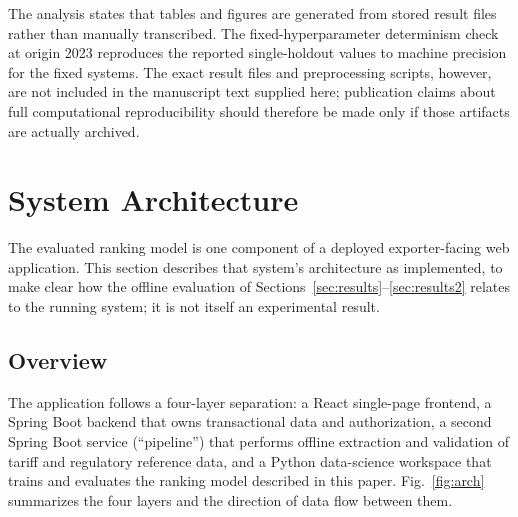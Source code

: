 \documentclass[conference]{IEEEtran}
\begin{document}
The analysis states that tables and figures are generated from stored result files rather than manually transcribed. The fixed-hyperparameter determinism check at origin 2023 reproduces the reported single-holdout values to machine precision for the fixed systems. The exact result files and preprocessing scripts, however, are not included in the manuscript text supplied here; publication claims about full computational reproducibility should therefore be made only if those artifacts are actually archived.

\section{System Architecture}
\label{sec:architecture}

The evaluated ranking model is one component of a deployed exporter-facing web application. This section describes that system's architecture as implemented, to make clear how the offline evaluation of Sections~\ref{sec:results}--\ref{sec:results2} relates to the running system; it is not itself an experimental result.

\subsection{Overview}

The application follows a four-layer separation: a React single-page frontend, a Spring Boot backend that owns transactional data and authorization, a second Spring Boot service (``pipeline'') that performs offline extraction and validation of tariff and regulatory reference data, and a Python data-science workspace that trains and evaluates the ranking model described in this paper. Fig.~\ref{fig:arch} summarizes the four layers and the direction of data flow between them.
\end{document}
